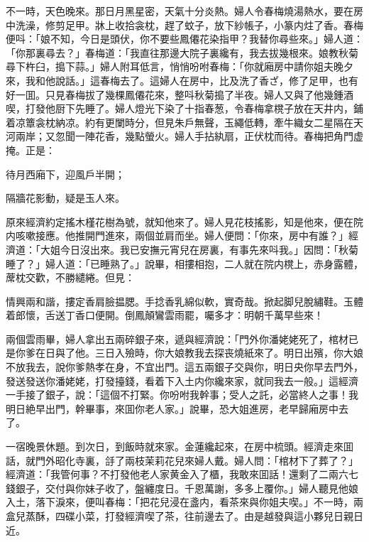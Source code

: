 不一時，天色晚來。那日月黑星密，天氣十分炎熱。婦人令春梅燒湯熱水，要在房中洗澡，修剪足甲。牀上收拾衾枕，趕了蚊子，放下紗帳子，小篆内炷了香。春梅便呌：「娘不知，今日是頭伏，你不要些鳳僊花染指甲？我替你尋些來。」婦人道：「你那裏尋去？」春梅道：「我直往那邊大院子裏纔有，我去拔幾根來。娘教秋菊尋下杵臼，搗下蒜。」婦人附耳低言，悄悄吩咐春梅：「你就廂房中請你姐夫晚夕來，我和他說話。」這春梅去了。這婦人在房中，比及洗了香ざ，修了足甲，也有好一囬。只見春梅拔了幾棵鳳僊花來，整呌秋菊搗了半夜。婦人又與了他幾鍾酒喫，打發他厨下先睡了。婦人燈光下染了十指春葱，令春梅拿櫈子放在天井内，鋪着凉簟衾枕納凉。約有更闌時分，但見朱戶無聲，玉繩低轉，牽牛織女二星隔在天河兩岸；又忽聞一陣花香，幾點螢火。婦人手拈紈扇，正伏枕而待。春梅把角門虚掩。正是：

\begin{myquote}
待月西廂下，迎風戶半開；

隔牆花影動，疑是玉人來。
\end{myquote}

原來經濟約定搖木槿花樹為號，就知他來了。婦人見花枝搖影，知是他來，便在院内咳嗽接應。他推開門進來，兩個並肩而坐。婦人便問：「你來，房中有誰？」經濟道：「大姐今日沒出來。我已安撫元宵兒在房裏，有事先來呌我。」因問：「秋菊睡了？」婦人道：「已睡熟了。」說畢，相摟相抱，二人就在院内櫈上，赤身露體，蓆枕交歡，不勝繾綣。但見：

\begin{myquote}
情興兩和諧，摟定香肩臉揾腮。手捻香乳綿似軟，實奇哉。掀起脚兒脫繡鞋。玉體着郎懷，舌送丁香口便開。倒鳳顛鸞雲雨罷，囑多才：明朝千萬早些來！
\end{myquote}

兩個雲雨畢，婦人拿出五兩碎銀子來，遞與經濟說：「門外你潘姥姥死了，棺材已是你爹在日與了他。三日入殮時，你大娘教我去探丧燒紙來了。明日出殯，你大娘不放我去，說你爹熱孝在身，不宜出門。這五兩銀子交與你，明日央你早去門外，發送發送你潘姥姥，打發擡錢，看着下入土内你纔來家，就同我去一般。」這經濟一手接了銀子，說：「這個不打緊。你吩咐我幹事；受人之託，必當終人之事！我明日絶早出門，幹畢事，來囬你老人家。」說畢，恐大姐進房，老早歸廂房中去了。

一宿晚景休題。到次日，到飯時就來家。金蓮纔起來，在房中梳頭。經濟走來囬話，就門外昭化寺裏，㧱了兩枝茉莉花兒來婦人戴。婦人問：「棺材下了葬了？」經濟道：「我管何事？不打發他老人家黄金入了櫃，我敢來囬話！還剩了二兩六七錢銀子，交付與你妹子收了，盤纏度日。千恩萬謝，多多上覆你。」婦人聽見他娘入土，落下淚來，便叫春梅：「把花兒浸在盞内，看茶來與你姐夫喫。」不一時，兩盒兒蒸酥，四碟小菜，打發經濟喫了茶，往前邊去了。由是越發與這小夥兒日親日近。

